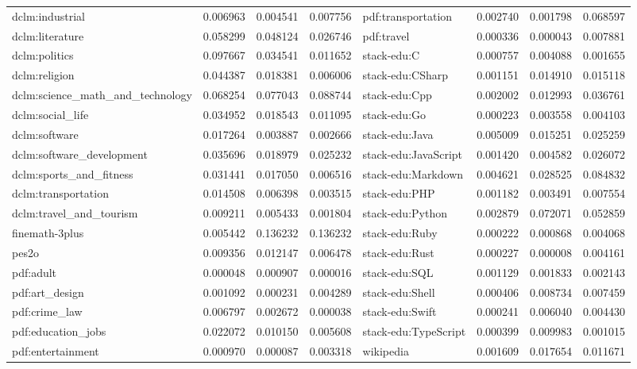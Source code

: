 \begin{table}[t]
\begin{tabular}{lccc | lccc}
dclm:industrial & 0.006963 & 0.004541 & 0.007756 & pdf:transportation & 0.002740 & 0.001798 & 0.068597 \\
dclm:literature & 0.058299 & 0.048124 & 0.026746 & pdf:travel & 0.000336 & 0.000043 & 0.007881 \\
dclm:politics & 0.097667 & 0.034541 & 0.011652 & stack-edu:C & 0.000757 & 0.004088 & 0.001655 \\
dclm:religion & 0.044387 & 0.018381 & 0.006006 & stack-edu:CSharp & 0.001151 & 0.014910 & 0.015118 \\
dclm:science\_math\_and\_technology & 0.068254 & 0.077043 & 0.088744 & stack-edu:Cpp & 0.002002 & 0.012993 & 0.036761 \\
dclm:social\_life & 0.034952 & 0.018543 & 0.011095 & stack-edu:Go & 0.000223 & 0.003558 & 0.004103 \\
dclm:software & 0.017264 & 0.003887 & 0.002666 & stack-edu:Java & 0.005009 & 0.015251 & 0.025259 \\
dclm:software\_development & 0.035696 & 0.018979 & 0.025232 & stack-edu:JavaScript & 0.001420 & 0.004582 & 0.026072 \\
dclm:sports\_and\_fitness & 0.031441 & 0.017050 & 0.006516 & stack-edu:Markdown & 0.004621 & 0.028525 & 0.084832 \\
dclm:transportation & 0.014508 & 0.006398 & 0.003515 & stack-edu:PHP & 0.001182 & 0.003491 & 0.007554 \\
dclm:travel\_and\_tourism & 0.009211 & 0.005433 & 0.001804 & stack-edu:Python & 0.002879 & 0.072071 & 0.052859 \\
finemath-3plus & 0.005442 & 0.136232 & 0.136232 & stack-edu:Ruby & 0.000222 & 0.000868 & 0.004068 \\
pes2o & 0.009356 & 0.012147 & 0.006478 & stack-edu:Rust & 0.000227 & 0.000008 & 0.004161 \\
pdf:adult & 0.000048 & 0.000907 & 0.000016 & stack-edu:SQL & 0.001129 & 0.001833 & 0.002143 \\
pdf:art\_design & 0.001092 & 0.000231 & 0.004289 & stack-edu:Shell & 0.000406 & 0.008734 & 0.007459 \\
pdf:crime\_law & 0.006797 & 0.002672 & 0.000038 & stack-edu:Swift & 0.000241 & 0.006040 & 0.004430 \\
pdf:education\_jobs & 0.022072 & 0.010150 & 0.005608 & stack-edu:TypeScript & 0.000399 & 0.009983 & 0.001015 \\
pdf:entertainment & 0.000970 & 0.000087 & 0.003318 & wikipedia & 0.001609 & 0.017654 & 0.011671 \\
\bottomrule
\end{tabular}
\label{tab:full_domain_mixtures}
\end{table}
